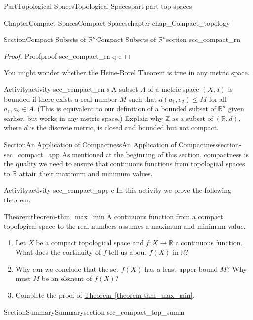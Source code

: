 \documentclass[oneside,10pt,]{book}
\newcommand{\xreffont}{\relax}
\numberwithin{equation}{chapter}
\newcommand{\Z}{\mathbb{Z}}
\newcommand{\R}{\mathbb{R}}
\begin{document}
\begin{partptx}{Part}{Topological Spaces}{}{Topological Spaces}{}{}{part-part-top-spaces}
\begin{chapterptx}{Chapter}{Compact Spaces}{}{Compact Spaces}{}{}{chapter-chap_Compact_topology}
\begin{sectionptx}{Section}{Compact Subsets of \(\R^n\)}{}{Compact Subsets of \(\R^n\)}{}{}{section-sec_compact_rn}
\begin{proof}{Proof}{}{proof-sec_compact_rn-q-c}
\end{proof}
You might wonder whether the Heine-Borel Theorem is true in any metric space.%
\begin{activity}{Activity}{}{activity-sec_compact_rn-s}%
A subset \(A\) of a metric space \((X, d)\) is bounded if there exists a real number \(M\) such that \(d(a_1,a_2) \leq M\) for all \(a_1, a_2 \in A\). (This is equivalent to our definition of a bounded subset of \(\R^n\) given earlier, but works in any metric space.) Explain why \(\Z\) as a subset of \((\R,d)\), where \(d\) is the discrete metric, is closed and bounded but not compact.%
\end{activity}%
\end{sectionptx}
%
%
\typeout{************************************************}
\typeout{************************************************}
%
\begin{sectionptx}{Section}{An Application of Compactness}{}{An Application of Compactness}{}{}{section-sec_compact_app}
As mentioned at the beginning of this section, compactness is the quality we need to ensure that continuous functions from topological spaces to \(\R\) attain their maximum and minimum values.%
\begin{activity}{Activity}{}{activity-sec_compact_app-c}%
In this activity we prove the following theorem.%
\begin{theorem}{Theorem}{}{}{theorem-thm_max_min}%
A continuous function from a compact topological space to the real numbers assumes a maximum and minimum value.%
\end{theorem}
\begin{enumerate}[font=\bfseries,label=(\alph*),ref=\alph*]%
\item{}Let \(X\) be a compact topological space and \(f: X \to \R\) a continuous function. What does the continuity of \(f\) tell us about \(f(X)\) in \(\R\)?%
\item{}Why can we conclude that the set \(f(X)\) has a least upper bound \(M\)? Why must \(M\) be an element of \(f(X)\)?%
\item{}Complete the proof of \hyperref[theorem-thm_max_min]{Theorem~{\xreffont\ref{theorem-thm_max_min}}}.%
\end{enumerate}%
\end{activity}%
\end{sectionptx}
%
%
\typeout{************************************************}
\typeout{************************************************}
%
\begin{sectionptx}{Section}{Summary}{}{Summary}{}{}{section-sec_compact_top_summ}

\end{sectionptx}
\end{chapterptx}
\end{partptx}
\end{document}
